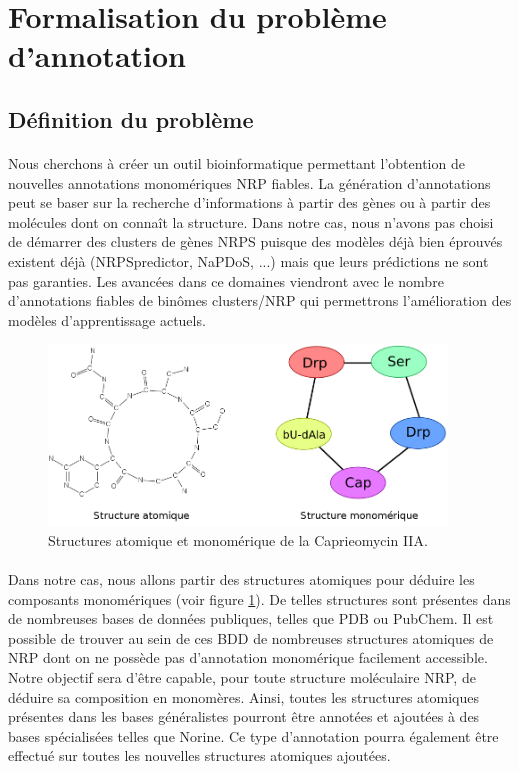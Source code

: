 \documentclass[12pt,french,twoside]{report}
\begin{document}
\section{Formalisation du problème d'annotation}

\subsection{Définition du problème}

\paragraph{}Nous cherchons à créer un outil bioinformatique permettant l'obtention de nouvelles annotations monomériques NRP fiables.
La génération d'annotations peut se baser sur la recherche d'informations à partir des gènes ou à partir des molécules dont on connaît la structure.
Dans notre cas, nous n'avons pas choisi de démarrer des clusters de gènes NRPS puisque des modèles déjà bien éprouvés existent déjà (NRPSpredictor, NaPDoS, ...) mais que leurs prédictions ne sont pas garanties.
Les avancées dans ce domaines viendront avec le nombre d'annotations fiables de binômes clusters/NRP qui permettrons l'amélioration des modèles d'apprentissage actuels.

\begin{figure}[!ht]
  \begin{center}
    \includegraphics[width=400px]{Figures/s2m/Intro/structures.png}
    \caption{\label{structures}Structures atomique et monomérique de la Caprieomycin IIA.}
  \end{center}
\end{figure}

\paragraph{}Dans notre cas, nous allons partir des structures atomiques pour déduire les composants monomériques (voir figure \ref{structures}).
De telles structures sont présentes dans de nombreuses bases de données publiques, telles que PDB ou PubChem.
Il est possible de trouver au sein de ces BDD de nombreuses structures atomiques de NRP dont on ne possède pas d'annotation monomérique facilement accessible.
Notre objectif sera d'être capable, pour toute structure moléculaire NRP, de déduire sa composition en monomères.
Ainsi, toutes les structures atomiques présentes dans les bases généralistes pourront être annotées et ajoutées à des bases spécialisées telles que Norine.
Ce type d'annotation pourra également être effectué sur toutes les nouvelles structures atomiques ajoutées.
\end{document}
